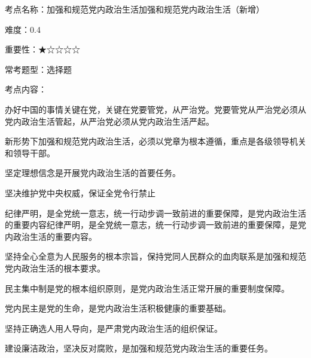 考点名称：加强和规范党内政治生活加强和规范党内政治生活（新增）

难度：0.4

重要性：★☆☆☆☆

常考题型：选择题

考点内容：

办好中国的事情关键在党，关键在党要管党，从严治党。党要管党从严治党必须从党内政治生活管起，从严治党必须从党内政治生活严起。

新形势下加强和规范党内政治生活，必须以党章为根本遵循，重点是各级领导机关和领导干部。

坚定理想信念是开展党内政治生活的首要任务。

坚决维护党中央权威，保证全党令行禁止

纪律严明，是全党统一意志，统一行动步调一致前进的重要保障，是党内政治生活的重要内容纪律严明，是全党统一意志，统一行动步调一致前进的重要保障，是党内政治生活的重要内容。

坚持全心全意为人民服务的根本宗旨，保持党同人民群众的血肉联系是加强和规范党内政治生活的根本要求。

民主集中制是党的根本组织原则，是党内政治生活正常开展的重要制度保障。

党内民主是党的生命，是党内政治生活积极健康的重要基础。

坚持正确选人用人导向，是严肃党内政治生活的组织保证。

建设廉洁政治，坚决反对腐败，是加强和规范党内政治生活的重要任务。
